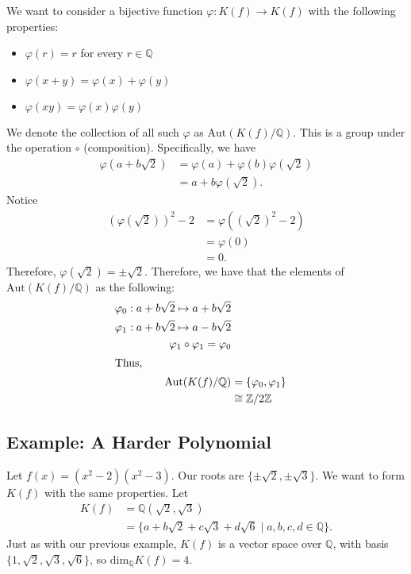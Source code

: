 \documentclass[8pt]{extarticle}
\newcommand{\Q}{\mathbb{Q}}
\newcommand{\Z}{\mathbb{Z}}
\begin{document}
  We want to consider a bijective function $\varphi: K(f)\rightarrow K(f)$ with the following properties:
  \begin{itemize}
    \item $\varphi(r) = r$ for every $r\in\Q$
    \item $\varphi(x+y) = \varphi(x) + \varphi(y)$
    \item $\varphi(xy) = \varphi(x)\varphi(y)$
  \end{itemize}
  We denote the collection of all such $\varphi$ as $\text{Aut}(K(f)/\Q)$. This is a group under the operation $\circ$ (composition). Specifically, we have
  \begin{align*}
    \varphi(a+b\sqrt{2}) &= \varphi(a) + \varphi(b)\varphi(\sqrt{2})\\
                         &= a + b\varphi(\sqrt{2}).
  \end{align*}
  Notice
  \begin{align*}
    \left(\varphi(\sqrt{2})\right)^2 - 2 &= \varphi \left(\left(\sqrt{2}\right)^2 - 2\right)\\
                            &= \varphi(0)\\
                            &= 0.
  \end{align*}
  Therefore, $\varphi(\sqrt{2}) = \pm \sqrt{2}$. Therefore, we have that the elements of $\text{Aut}(K(f)/\Q)$ as the following:
  \begin{align*}
    \varphi_0: a+b\sqrt{2} \mapsto a+b\sqrt{2}\\
    \varphi_1: a+b\sqrt{2} \mapsto a-b\sqrt{2}\\
    \varphi_1\circ\varphi_1 = \varphi_0\\
    \shortintertext{Thus,}
    \text{Aut}(K(f)/\Q) &= \{\varphi_0,\varphi_1\}\\
                        &\cong \Z/2\Z
  \end{align*}
  \subsection{Example: A Harder Polynomial}%
  Let $f(x) = (x^2-2)(x^2-3)$. Our roots are $\{\pm\sqrt{2},\pm\sqrt{3}\}$. We want to form $K(f)$ with the same properties. Let
  \begin{align*}
    K(f) &= \Q(\sqrt{2},\sqrt{3})\\
    &= \{a+b\sqrt{2}+c\sqrt{3}+d\sqrt{6}\mid a,b,c,d\in\Q\}.
  \end{align*}
  Just as with our previous example, $K(f)$ is a vector space over $\Q$, with basis $\{1,\sqrt{2},\sqrt{3},\sqrt{6}\}$, so $\text{dim}_{\Q}K(f) = 4$.\\
\end{document}
